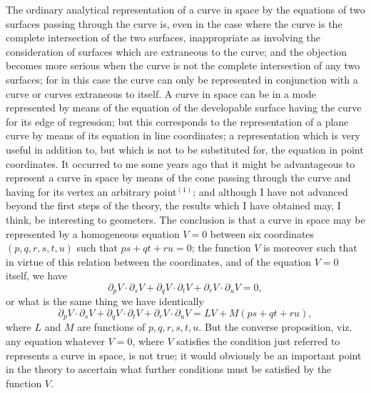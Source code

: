 \documentclass[11pt,a4paper]{book}
\begin{document}
The ordinary analytical representation of a curve in space by the equations of two surfaces passing through the curve is, even in the case where the curve is the complete intersection of the two surfaces, inappropriate as involving the consideration of surfaces which are extraneous to the curve; and the objection becomes more serious when the curve is not the complete intersection of any two surfaces; for in this case the curve can only be represented in conjunction with a curve or curves extraneous to itself. A curve in space can be in a mode represented by means of the equation of the developable surface having the curve for its edge of regression; but this corresponds to the representation of a plane curve by means of its equation in line coordinates; a representation which is very useful in addition to, but which is not to be substituted for, the equation in point coordinates. It occurred to me some years ago that it might be advantageous to represent a curve in space by means of the cone passing through the curve and having for its vertex an arbitrary point$^{(1)}$; and although I have not advanced beyond the first steps of the theory, the results which I have obtained may, I think, be interesting to geometers. The conclusion is that a curve in space may be represented by a homogeneous equation $V = 0$ between six coordinates $(p, q, r, s, t, u)$ such that $ps + qt + ru = 0$; the function $V$ is moreover such that in virtue of this relation between the coordinates, and of the equation $V = 0$ itself, we have
\[
\partial_p V \cdot \partial_s V + \partial_q V \cdot \partial_t V + \partial_r V \cdot \partial_u V = 0,
\]
or what is the same thing we have identically
\[
\partial_p V \cdot \partial_s V + \partial_q V \cdot \partial_t V + \partial_r V \cdot \partial_u V = LV + M(ps + qt + ru),
\]
where $L$ and $M$ are functions of $p, q, r, s, t, u$. But the converse proposition, viz. any equation whatever $V = 0$, where $V$ satisfies the condition just referred to represents a curve in space, is not true; it would obviously be an important point in the theory to ascertain what further conditions must be satisfied by the function $V$.
\end{document}
